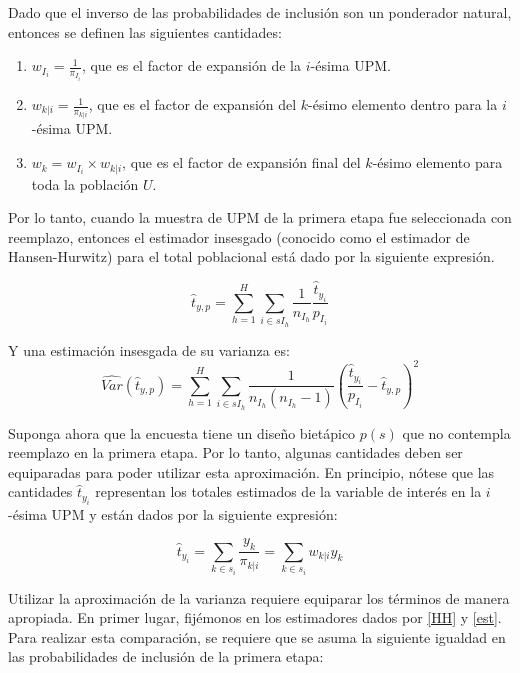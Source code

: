 \documentclass[
  12pt,
  spanish,
]{book}
\providecommand{\tightlist}{%
  \setlength{\itemsep}{0pt}\setlength{\parskip}{0pt}}
\begin{document}
Dado que el inverso de las probabilidades de inclusión son un ponderador natural, entonces se definen las siguientes cantidades:

\begin{enumerate}
\def\labelenumi{\arabic{enumi}.}
\tightlist
\item
  \(w_{I_i} = \frac{1}{\pi_{I_i}}\), que es el factor de expansión de la \(i\)-ésima UPM.
\item
  \(w_{k|i} = \frac{1}{\pi_{k|i}}\), que es el factor de expansión del \(k\)-ésimo elemento dentro para la \(i\)-ésima UPM.
\item
  \(w_k = w_{I_i} \times w_{k|i}\), que es el factor de expansión final del \(k\)-ésimo elemento para toda la población \(U\).
\end{enumerate}

Por lo tanto, cuando la muestra de UPM de la primera etapa fue seleccionada con reemplazo, entonces el estimador insesgado (conocido como el estimador de Hansen-Hurwitz) para el total poblacional está dado por la siguiente expresión.

\begin{equation}
\label{HH}
\hat{t}_{y,p}=\sum_{h=1}^H \sum_{i \in sI_h}\frac{1}{n_{I_h}}\frac{\hat{t}_{y_i}}{p_{I_i}}
\end{equation}

Y una estimación insesgada de su varianza es:
\begin{equation}
\label{var}
\widehat{Var}(\hat{t}_{y,p})=\sum_{h=1}^H \sum_{i \in sI_h}\frac{1}{n_{I_h}(n_{I_h}-1)}\left(\frac{\hat{t}_{y_i}}{p_{I_i}}-\hat{t}_{y,p}\right)^2
\end{equation}

Suponga ahora que la encuesta tiene un diseño bietápico \(p(s)\) que no contempla reemplazo en la primera etapa. Por lo tanto, algunas cantidades deben ser equiparadas para poder utilizar esta aproximación. En principio, nótese que las cantidades \(\hat{t}_{y_i}\) representan los totales estimados de la variable de interés en la \(i\)-ésima UPM y están dados por la siguiente expresión:

\begin{equation}
\hat{t}_{y_i} = \sum_{k \in s_i} \frac{y_k}{\pi_{k|i}}
= \sum_{k \in s_i} w_{k|i} y_k 
\end{equation}

Utilizar la aproximación de la varianza requiere equiparar los términos de manera apropiada. En primer lugar, fijémonos en los estimadores dados por \eqref{HH} y \eqref{est}. Para realizar esta comparación, se requiere que
se asuma la siguiente igualdad en las probabilidades de inclusión de la primera etapa:
\end{document}

